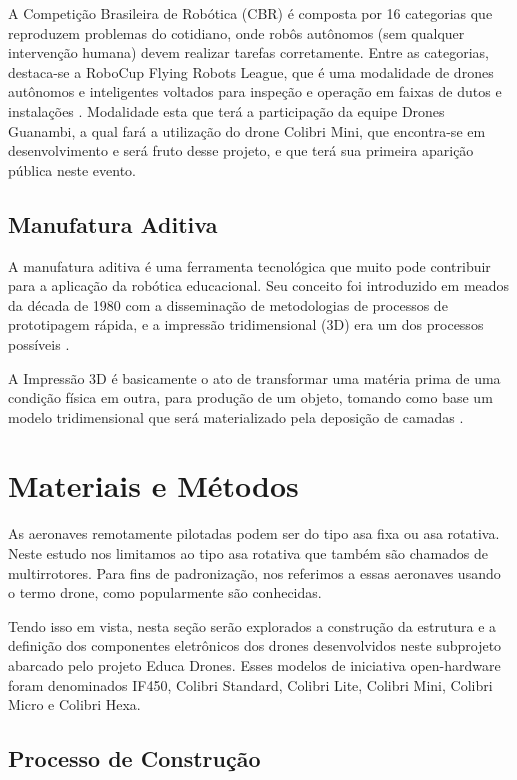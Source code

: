 \documentclass[conference]{IEEEtran}
\begin{document}
A Competição Brasileira de Robótica (CBR) é composta por 16 categorias que reproduzem problemas do cotidiano, onde robôs autônomos (sem qualquer intervenção humana) devem realizar tarefas corretamente. Entre as categorias, destaca-se a RoboCup Flying Robots League, que é uma modalidade de drones autônomos e inteligentes voltados para inspeção e operação em faixas de dutos e instalações \cite{b3}. Modalidade esta que terá a participação da equipe Drones Guanambi, a qual fará a utilização do drone Colibri Mini, que encontra-se em desenvolvimento e será fruto desse projeto, e que terá sua primeira aparição pública neste evento.

\subsection{Manufatura Aditiva}

A manufatura aditiva é uma ferramenta tecnológica que muito pode contribuir para a aplicação da robótica educacional. Seu conceito foi introduzido em meados da década de 1980 com a disseminação de metodologias de processos de prototipagem rápida, e a impressão tridimensional (3D) era um dos processos possíveis \cite{b10}.

A Impressão 3D é basicamente o ato de transformar uma matéria prima de uma condição física em outra, para produção de um objeto, tomando como base um modelo tridimensional que será materializado pela deposição de camadas \cite{b8}.

\section{Materiais e Métodos}

As aeronaves remotamente pilotadas podem ser do tipo asa fixa ou asa rotativa. Neste estudo nos limitamos ao tipo asa rotativa que também são chamados de multirrotores. Para fins de padronização, nos referimos a essas aeronaves usando o termo drone, como popularmente são conhecidas.

Tendo isso em vista, nesta seção serão explorados a construção da estrutura e a definição dos componentes eletrônicos dos drones desenvolvidos neste subprojeto abarcado pelo projeto Educa Drones. Esses modelos de iniciativa open-hardware foram denominados IF450, Colibri Standard, Colibri Lite, Colibri Mini, Colibri Micro e Colibri Hexa.


\subsection{Processo de Construção}
\end{document}
